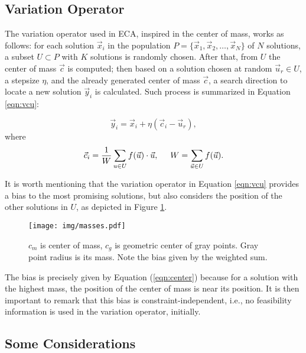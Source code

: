 \documentclass[12pt,letterpape]{article}
\begin{document}
\subsection{Variation Operator} %
\label{sub:algorithm_description}

The variation operator used in ECA, inspired in the center of mass, works as follows: 
for each solution $\vec{x}_i $ in the population $P = \{ \vec{x}_1, \vec{x}_2, \ldots, \vec{x}_{N} \} $ of $N$ 
solutions, a subset $U \subset P $ with $K$ solutions is randomly chosen. After 
that, from $U$ the center of mass $\vec{c}$ is computed; then based on  a solution 
chosen at random $\vec{u}_r \in U$, a stepsize $\eta$, and the already generated 
center of mass $\vec{c}$, a search direction to locate a new solution $ \vec{y}_i$ 
is calculated. Such process is summarized in Equation \ref{eqn:vcu}:

\begin{equation}
	\vec{y}_i = \vec{x}_i + \eta ( \vec{c}_i - \vec{u}_{r} ),
	\label{eqn:vcu}
\end{equation}
%
where 
%
\begin{equation}
	\vec{c}_i = \dfrac{1} {W} \sum_{u \in U} f(\vec{u}) \cdot \vec{u} , 
			\hspace{0.5cm} 
			W = \sum_{ \vec{u} \in U} f(\vec{u}).
	\label{eqn:center}
\end{equation}

It is worth mentioning that the variation operator in Equation \ref{eqn:vcu} 
provides a bias to the most promising solutions, but also considers the position 
of the other solutions in $U$, as depicted in  Figure \ref{fig:masses}. 

\begin{figure}[!ht]
	\centering
	\texttt{[image: img/masses.pdf]}
	\caption{$c_m$ is center of mass, $c_g$ is geometric center of gray points. %
	Gray point radius is its mass. Note the bias given by the weighted sum.}
	\label{fig:masses}       %
\end{figure}
%
%
The bias is precisely given by Equation (\ref{eqn:center}) because for a solution 
with the highest mass, the position of the center of mass is near  
its position. It is then important to remark that this bias is constraint-independent, i.e., 
no feasibility information is used in the variation operator, initially.

\subsection{Some Considerations} %
\label{sub:some_considerations}
\end{document}
